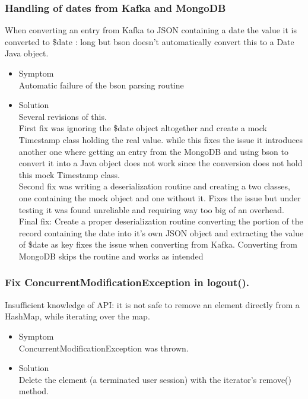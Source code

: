 \documentclass[oneside, english, final]{design}
\begin{document}
\subsubsection{Handling of dates from Kafka and MongoDB}

When converting an entry from Kafka to JSON containing a date the value it is converted to {\$date : long} but bson doesn't automatically convert this to a Date Java object.

\begin{itemize}
      \item{Symptom
            \\
            Automatic failure of the bson parsing routine
	}
      \item{Solution
            \\
            Several revisions of this.
            \\
            First fix was ignoring the \$date object altogether and create a mock Timestamp class holding the real value. while this fixes the issue it introduces another one where getting an entry from the MongoDB and using bson to convert it into a Java object does not work since the conversion does not hold this mock Timestamp class.\\
            Second fix was writing a deserialization routine and creating a two classes, one containing the mock object and one without it. Fixes the issue but under testing it was found unreliable and requiring way too big of an overhead.\\
            Final fix: Create a proper deserialization routine converting the portion of the record containing the date into it's own JSON object and extracting the value of \$date as key fixes the issue when converting from Kafka. Converting from MongoDB skips the routine and works as intended
            }
\end{itemize}


\subsubsection{Fix ConcurrentModificationException in logout().}

Insufficient knowledge of API: it is not safe to remove an element directly from a HashMap, while iterating over the map.

\begin{itemize}
      \item{Symptom
            \\
            ConcurrentModificationException was thrown.
	}
      \item{Solution
            \\
            Delete the element (a terminated user session) with the iterator's remove() method.
            }
\end{itemize}
\end{document}
